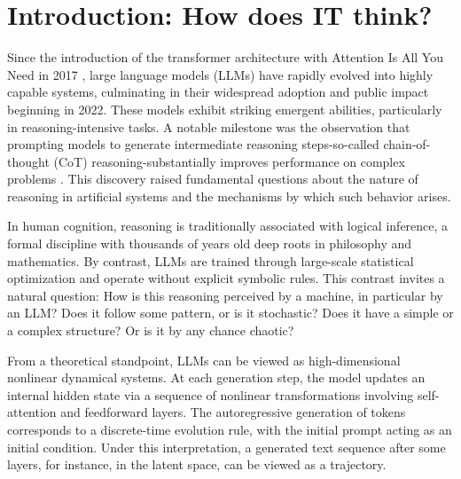 \documentclass[aip%
 aip,
 amsmath,amssymb,
 reprint,%
]{revtex4-1}
\begin{document}
\section{Introduction: How does IT think?}\label{sec:intro}
Since the introduction of the transformer architecture with Attention Is All You Need in 2017 \cite{attention}, large language models (LLMs) have rapidly evolved into highly capable systems, culminating in their widespread adoption and public impact beginning in 2022. These models exhibit striking emergent abilities, particularly in reasoning-intensive tasks. A notable milestone was the observation that prompting models to generate intermediate reasoning steps-so-called chain-of-thought (CoT) reasoning-substantially improves performance on complex problems \cite{wei2023chainofthoughtpromptingelicitsreasoning}. This discovery raised fundamental questions about the nature of reasoning in artificial systems and the mechanisms by which such behavior arises.

In human cognition, reasoning is traditionally associated with logical inference, a formal discipline with thousands of years old deep roots in philosophy and mathematics. By contrast, LLMs are trained through large-scale statistical optimization and operate without explicit symbolic rules. This contrast invites a natural question: How is this reasoning perceived by a machine, in particular by an LLM? Does it follow some pattern, or is it stochastic? Does it have a simple or a complex structure? Or is it by any chance chaotic?

From a theoretical standpoint, LLMs can be viewed as high-dimensional nonlinear dynamical systems. At each generation step, the model updates an internal hidden state via a sequence of nonlinear transformations involving self-attention and feedforward layers. The autoregressive generation of tokens corresponds to a discrete-time evolution rule, with the initial prompt acting as an initial condition. Under this interpretation, a generated text sequence after some layers, for instance, in the latent space, can be viewed as a trajectory.
\end{document}
